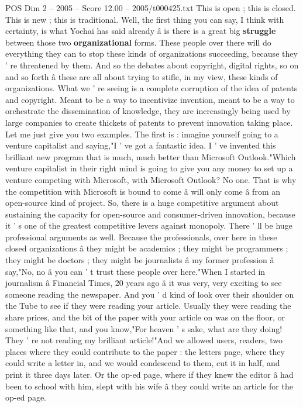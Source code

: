 \begin{textsample}{POS Dim 2 – 2005 – Score 12.00 – 2005/t000425.txt}
This is open ; this is closed.
This is new ; this is traditional.
Well, the first thing you can say, I think with certainty, is what Yochai has said already â is there is a great big \textbf{struggle} between those two \textbf{organizational} forms.
These people over there will do everything they can to stop these kinds of organizations succeeding, because they ' re threatened by them.
And so the debates about copyright, digital rights, so on and so forth â these are all about trying to stifle, in my view, these kinds of organizations.
What we ' re seeing is a complete corruption of the idea of patents and copyright.
Meant to be a way to incentivize invention, meant to be a way to orchestrate the dissemination of knowledge, they are increasingly being used by large companies to create thickets of patents to prevent innovation taking place.
Let me just give you two examples.
The first is : imagine yourself going to a venture capitalist and saying,"I ' ve got a fantastic idea.
I ' ve invented this brilliant new program that is much, much better than Microsoft Outlook."Which venture capitalist in their right mind is going to give you any money to set up a venture competing with Microsoft, with Microsoft Outlook?
No one.
That is why the competition with Microsoft is bound to come â will only come â from an open-source kind of project.
So, there is a huge competitive argument about sustaining the capacity for open-source and consumer-driven innovation, because it ' s one of the greatest competitive levers against monopoly.
There ' ll be huge professional arguments as well.
Because the professionals, over here in these closed organizations â they might be academics ; they might be programmers ; they might be doctors ; they might be journalists â my former profession â say,"No, no â you can ' t trust these people over here."When I started in journalism â Financial Times, 20 years ago â it was very, very exciting to see someone reading the newspaper.
And you ' d kind of look over their shoulder on the Tube to see if they were reading your article.
Usually they were reading the share prices, and the bit of the paper with your article on was on the floor, or something like that, and you know,"For heaven ' s sake, what are they doing!
They ' re not reading my brilliant article!"And we allowed users, readers, two places where they could contribute to the paper : the letters page, where they could write a letter in, and we would condescend to them, cut it in half, and print it three days later.
Or the op-ed page, where if they knew the editor â had been to school with him, slept with his wife â they could write an article for the op-ed page.

\end{textsample}
